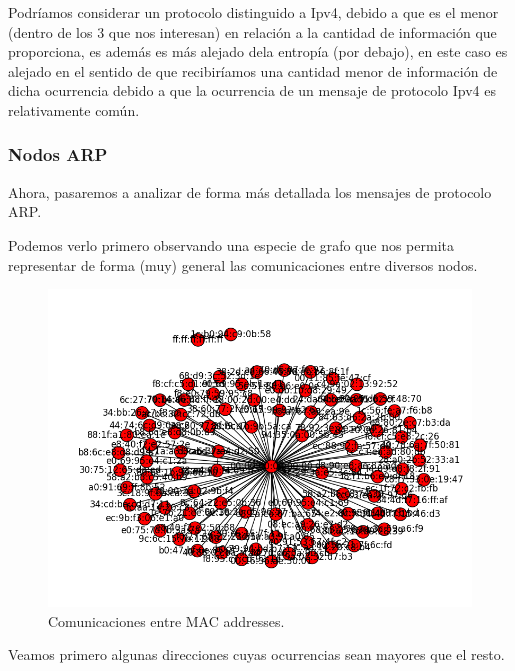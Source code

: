 \documentclass{article}
\theoremstyle{definition}
\theoremstyle{remark}
\begin{document}
Podríamos considerar un protocolo distinguido a Ipv4, debido a que es el menor (dentro de los 3 que nos interesan) en relación a la cantidad de información que proporciona, es además es más alejado dela entropía (por debajo), en este caso es alejado en el sentido de que recibiríamos una cantidad menor de información de dicha ocurrencia debido a que la ocurrencia de un mensaje de protocolo Ipv4 es relativamente común.

\subsubsection{Nodos ARP}

Ahora, pasaremos a analizar de forma más detallada los mensajes de protocolo ARP.

Podemos verlo primero observando una especie de grafo que nos permita representar de forma (muy) general las comunicaciones entre diversos nodos.


\begin{figure}[H]
\centering
\includegraphics[width=450pt]{captures/LabosDC/conn_mac.png}
\caption{Comunicaciones entre MAC addresses.}
\end{figure}

Veamos primero algunas direcciones cuyas ocurrencias sean mayores que el resto.
\end{document}
